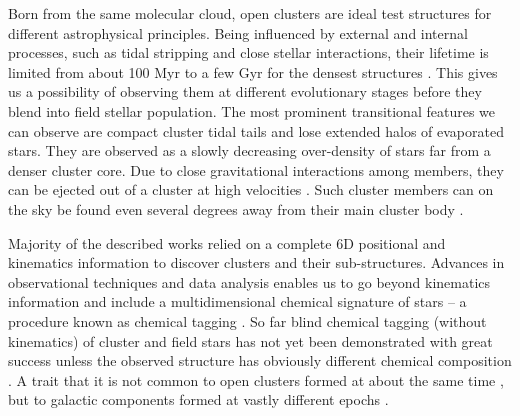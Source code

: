 Born from the same molecular cloud, open clusters are ideal test structures for different astrophysical principles. Being influenced by external and internal processes, such as tidal stripping and close stellar interactions, their lifetime is limited from about 100 Myr to a few Gyr for the densest structures \citep{1998A&A...337..363P, 2013MNRAS.434.2509M}. This gives us a possibility of observing them at different evolutionary stages \citep{2006BASI...34..153C, 2007A&A...468..139P} before they blend \citep{2001A&A...366..827B} into field stellar population. The most prominent transitional features we can observe are compact cluster tidal tails \citep{2019AA...627A...4R, 2019AJ....157..115Y, 2019AA...621L...3M, 2019arXiv191206657Z} and lose extended halos of evaporated stars. They are observed as a slowly decreasing over-density \citep{2002A&A...385..471C, 2004A&A...427..485B, 2019AA...627A.119C} of stars far from a denser cluster core. Due to close gravitational interactions among members, they can be ejected out of a cluster at high velocities \citep{2009MNRAS.396..570G, 2010MNRAS.402..105G, 2017MNRAS.470.3049R}. Such cluster members can on the sky be found even several degrees away from their main cluster body \citep{2007MNRAS.376L..29G, 2018MNRAS.473.4612K, 2019ApJ...884....6M}.

Majority of the described works relied on a complete 6D positional and kinematics information to discover clusters and their sub-structures. Advances in observational techniques and data analysis enables us to go beyond kinematics information and include a multidimensional chemical signature of stars -- a procedure known as chemical tagging \citep{2002ARA&A..40..487F, 2010ApJ...721..582B}. So far blind chemical tagging (without kinematics) of cluster and field stars has not yet been demonstrated with great success unless the observed structure has obviously different chemical composition \citep{2016ApJ...833..262H}. A trait that it is not common to open clusters formed at about the same time \citep{2019A&A...629A..34G}, but to galactic components formed at vastly different epochs \citep{2018A&A...619A.125A}.

